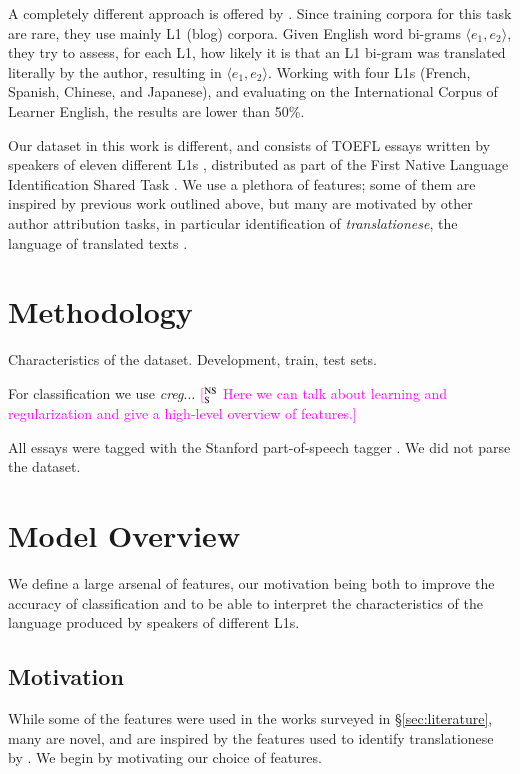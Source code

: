 \documentclass[11pt,letterpaper]{article}
\newcommand{\ensuretext}[1]{#1}
\newcommand{\nssmarker}{\ensuretext{\textcolor{magenta}{\ensuremath{^{\textsc{NS}}_{\textsc{S}}}}}}
\newcommand{\arkcomment}[3]{\ensuretext{\textcolor{#3}{[#1 #2]}}}
\newcommand{\nss}[1]{\arkcomment{\nssmarker}{#1}{magenta}}
\newcommand{\Sref}[1]{\S\ref{#1}}
\begin{document}
A completely different approach is offered by
\citet{brooke2011native}. Since training corpora for this task are
rare, they use mainly L1 (blog) corpora. Given English word bi-grams
$\langle e_1,e_2\rangle$, they try to assess, for each L1, how likely
it is that an L1 bi-gram was translated literally by the author,
resulting in $\langle e_1,e_2\rangle$. Working with four L1s (French,
Spanish, Chinese, and Japanese), and evaluating on the International
Corpus of Learner English, the results are lower than 50\%.

Our dataset in this work is different, and consists of TOEFL essays
written by speakers of eleven different L1s
\citep{blanchard-tetreault-higgins-cahill-chodorow:2013:TOEFL11-RR},
distributed as part of the First Native Language Identification Shared
Task \citep{tetreault-blanchard-cahill:2013:BEA}. We use a plethora of
features; some of them are inspired by previous work outlined above,
but many are motivated by other author attribution tasks, in
particular identification of \emph{translationese}, the language of
translated texts \citep{vered:noam:shuly}.

\section{Methodology}
\label{sec:methodology}
Characteristics of the dataset. Development, train, test sets.

For classification we use \emph{creg}... \nss{Here we can talk about
  learning and regularization and give a high-level overview of
  features.}

All essays were tagged with the Stanford part-of-speech tagger
\citep{toutanova-03}. We did not parse the dataset.

\section{Model Overview}
\label{sec:features}
We define a large arsenal of features, our motivation being both to
improve the accuracy of classification and to be able to interpret the
characteristics of the language produced by speakers of different
L1s.

\subsection{Motivation}
While some of the features were used in the works surveyed in
\Sref{sec:literature}, many are novel, and are inspired by the
features used to identify translationese by \citet{vered:noam:shuly}.
We begin by motivating our choice of features.
\end{document}

